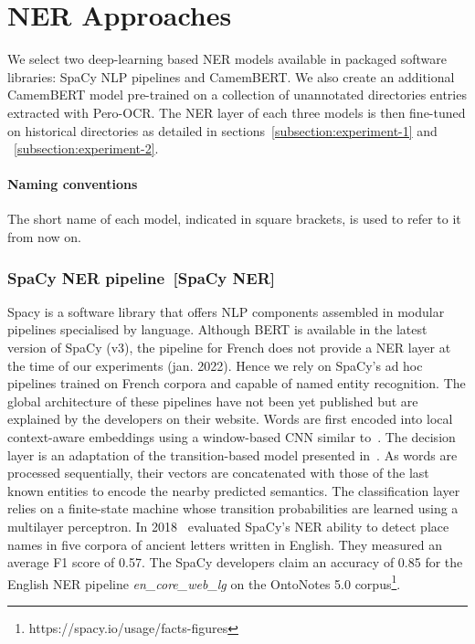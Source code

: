 \section{NER Approaches}
We select two deep-learning based NER models available in packaged software libraries: SpaCy NLP pipelines and CamemBERT.
We also create an additional CamemBERT model pre-trained on a collection of unannotated directories entries extracted with Pero-OCR.
The NER layer of each three models is then fine-tuned on historical directories as detailed in sections~\ref{subsection:experiment-1} and ~\ref{subsection:experiment-2}.

\paragraph{Naming conventions} The short name of each model, indicated in square brackets, is used to refer to it from now on.


\subsubsection{SpaCy NER pipeline~[SpaCy NER]}
Spacy is a software library that offers NLP components assembled in modular pipelines specialised by language.
Although BERT is available in the latest version of SpaCy (v3), the pipeline for French does not provide a NER layer at the time of our experiments (jan. 2022).
Hence we rely on SpaCy's ad hoc pipelines trained on French corpora and capable of named entity recognition.
The global architecture of these pipelines have not been yet published but are explained by the developers on their website.
Words are first encoded into local context-aware embeddings using a window-based CNN similar to~\cite{collobert2011}.
The decision layer is an adaptation of the transition-based model presented in~\cite{lample2016}.
As words are processed sequentially, their vectors are concatenated with those of the last known entities to encode the nearby predicted semantics.
The classification layer relies on a finite-state machine whose transition probabilities are learned using a multilayer perceptron.
In 2018~\cite{won2018} evaluated SpaCy's NER ability to detect place names in five corpora of ancient letters written in English.
They measured an average F1 score of 0.57.
The SpaCy developers claim an accuracy of 0.85 for the English NER pipeline \textit{en\_core\_web\_lg} on the OntoNotes 5.0 corpus\footnote{https://spacy.io/usage/facts-figures}.

